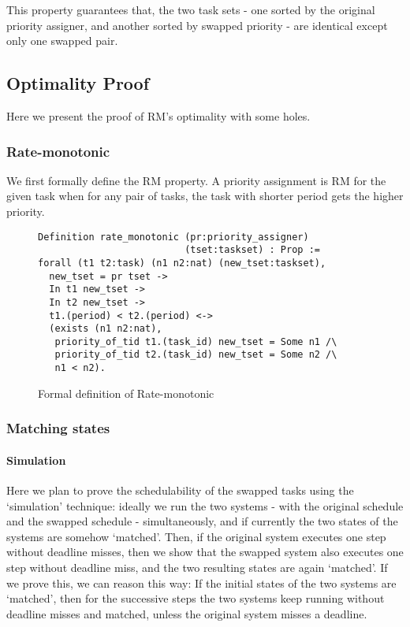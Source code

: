 \documentclass[nocopyrightspace]{sigplanconf}
\begin{document}
This property guarantees that, the two task sets - one sorted by the original
priority assigner, and another sorted by swapped priority - are identical except
only one swapped pair.

\subsection{Optimality Proof}

Here we present the proof of RM's optimality with some holes.

\subsubsection{Rate-monotonic}
We first formally define the RM property. A priority assignment is RM for the given task when
for any pair of tasks, the task with shorter period gets the higher priority.

\begin{figure}[H]
\begin{verbatim}
Definition rate_monotonic (pr:priority_assigner)
                          (tset:taskset) : Prop :=
forall (t1 t2:task) (n1 n2:nat) (new_tset:taskset),
  new_tset = pr tset -> 
  In t1 new_tset ->
  In t2 new_tset ->
  t1.(period) < t2.(period) <->
  (exists (n1 n2:nat),
   priority_of_tid t1.(task_id) new_tset = Some n1 /\
   priority_of_tid t2.(task_id) new_tset = Some n2 /\
   n1 < n2).
\end{verbatim}
\caption{ Formal definition of Rate-monotonic }\label{fig:rm-def}
\end{figure}

\subsubsection{Matching states}

\paragraph{Simulation}
Here we plan to prove the schedulability of the swapped tasks using the `simulation' technique:
ideally we run the two systems - with the original schedule and the swapped schedule - simultaneously,
and if currently the two states of the systems are somehow `matched'. Then, if the original system
executes one step without deadline misses, then we show that the swapped system also executes one step without
deadline miss, and the two resulting states are again `matched'. If we prove this, we can reason this way:
If the initial states of the two systems are `matched', then for the successive steps the two systems keep
running without deadline misses and matched, unless the original system misses a deadline.
\end{document}
